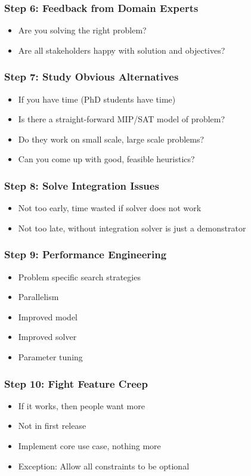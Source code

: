 \begin{frame}
\frametitle{Step 6: Feedback from Domain Experts}
\begin{itemize}
\item Are you solving the right problem?
  \item Are all stakeholders happy with solution and objectives?
\end{itemize}
\end{frame}

\begin{frame}
\frametitle{Step 7: Study Obvious Alternatives}
\begin{itemize}
\item If you have time (PhD students have time)
\item Is there a straight-forward MIP/SAT model of problem?
\item Do they work on small scale, large scale problems?
\item Can you come up with good, feasible heuristics?
\end{itemize}
\end{frame}

\begin{frame}
\frametitle{Step 8: Solve Integration Issues}
\begin{itemize}
\item Not too early, time wasted if solver does not work
\item Not too late, without integration solver is just a demonstrator
\end{itemize}
\end{frame}

\begin{frame}
\frametitle{Step 9: Performance Engineering}
\begin{itemize}
\item Problem specific search strategies
\item Parallelism
\item Improved model
\item Improved solver
  \item Parameter tuning
\end{itemize}
\end{frame}

\begin{frame}
\frametitle{Step 10: Fight Feature Creep}
\begin{itemize}
\item If it works, then people want more
\item Not in first release
\item Implement core use case, nothing more
  \item Exception: Allow all constraints to be optional
\end{itemize}
\end{frame}

